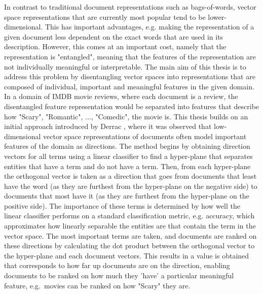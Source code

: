 \documentclass[a4paper,oneside,onecolumn,openright,12pt]{book}
\begin{document}
In contrast to traditional document representations such as bags-of-words, vector space representations that are currently most popular tend to be lower-dimensional. This has important advantages, e.g. making the representation of a given document less dependent on the exact words that are used in its description. However, this comes at an important cost, namely that the representation is  "entangled", meaning that the features of the representation are not individually meaningful or interpretable. The main aim of this thesis is to address this problem  by disentangling   vector spaces into representations that are composed of individual, important and meaningful features in the given domain. In a domain of IMDB movie reviews, where each document is a review, the disentangled feature representation would be separated into features that describe how "Scary", "Romantic", ..., "Comedic",  the  movie is. This thesis builds on an initial approach introduced by  Derrac \cite{Derrac2015}, where it was  observed that low-dimensional vector space representations of documents  often model important features of the domain as directions. The method begins by obtaining direction vectors for all terms  using a linear classifier to find a hyper-plane that separates entities that have a term and do not have a term. Then, from each hyper-plane the orthogonal vector is taken as a direction that goes from documents that least have the word (as they are furthest from the hyper-plane on the negative side) to documents that most have it (as they are furthest from the hyper-plane on the positive side). The importance of these terms is determined by how well the linear classifier performs on a standard classification metric, e.g. accuracy, which approximates how linearly separable the entities are that contain the term in the vector space. The most important terms are taken, and documents are ranked on these directions by calculating the dot product between the orthogonal vector to the hyper-plane and each document vectors. This results in  a value is obtained that corresponds to how  far up documents are on the direction, enabling    documents to be ranked on how much they 'have' a particular meaningful feature,  e.g.\ movies can be ranked on how "Scary" they are. %
\end{document}
